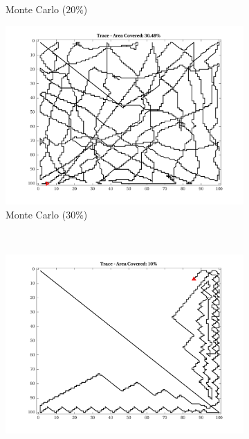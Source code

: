 \begin{figure}[htb!]
\begin{subfigure}[t]{0.32\textwidth}
        \ssp
        \captionsetup{skip=0.20\baselineskip,size=footnotesize}
        \caption{Monte Carlo ($20\%$)}
    \end{subfigure}%
    \begin{subfigure}[t]{0.32\textwidth}
        \centering
        \includegraphics[width=\linewidth]{figures/hbresults/path_mc_30p_100x100_sf_100_seed_2.png}
        \ssp
        \captionsetup{skip=0.20\baselineskip,size=footnotesize}
        \caption{Monte Carlo ($30\%$)}
    \end{subfigure}%
    \\
    \begin{subfigure}[t]{0.32\textwidth}
        \centering
        \includegraphics[width=\linewidth]{figures/hbresults/path_gradient_10p_100x100_sf_100_seed_2.png}

\end{subfigure}
\end{figure}
